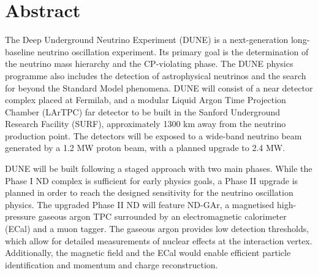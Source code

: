 \chapter*{Abstract}
\label{C:Abstract}

The Deep Underground Neutrino Experiment (DUNE) is a next-generation long-baseline neutrino oscillation experiment. Its primary goal is the determination of the neutrino mass hierarchy and the CP-violating phase. The DUNE physics programme also includes the detection of astrophysical neutrinos and the search for beyond the Standard Model phenomena. DUNE will consist of a near detector complex placed at Fermilab, and a modular Liquid Argon Time Projection Chamber (LArTPC) far detector to be built in the Sanford Underground Research Facility (SURF), approximately 1300 km away from the neutrino production point. The detectors will be exposed to a wide-band neutrino beam generated by a 1.2 MW proton beam, with a planned upgrade to 2.4 MW.

DUNE will be built following a staged approach with two main phases. While the Phase I ND complex is sufficient for early physics goals, a Phase II upgrade is planned in order to reach the designed sensitivity for the neutrino oscillation physics. The upgraded Phase II ND will feature ND-GAr, a magnetised high-pressure gaseous argon TPC surrounded by an electromagnetic calorimeter (ECal) and a muon tagger. The gaseous argon provides low detection thresholds, which allow for detailed measurements of nuclear effects at the interaction vertex. Additionally, the magnetic field and the ECal would enable efficient particle identification and momentum and charge reconstruction.